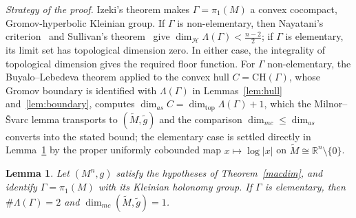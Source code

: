 \documentclass[12pt,oneside,a4paper]{article}
\theoremstyle{mytheorem}
\newtheorem{lemma}[definition]{Lemma}
\theoremstyle{remark}
\theoremstyle{definition}
\begin{document}
\medskip
\noindent\textit{Strategy of the proof.}
Izeki's theorem makes \(\Gamma=\pi_1(M)\) a convex cocompact,
Gromov-hyperbolic Kleinian group.  If \(\Gamma\) is non-elementary, then
Nayatani's criterion~\cite[Corollary~3.4]{zbMATH01028179} and Sullivan's
theorem~\cite{zbMATH03903608} give
\(\dim_{\mathcal H}\Lambda(\Gamma)<\frac{n-2}{2}\); if \(\Gamma\) is
elementary, its limit set has topological dimension zero.  In either case,
the integrality of topological dimension gives the required floor function.
For \(\Gamma\) non-elementary, the Buyalo--Lebedeva theorem \cite{zbMATH05232578} applied to the
convex hull \(C=\mathrm{CH}(\Gamma)\), whose
Gromov boundary is identified with \(\Lambda(\Gamma)\) in
Lemmas~\ref{lem:hull} and~\ref{lem:boundary}, computes
\(\dim_{as}C=\dim_{\mathrm{top}}\Lambda(\Gamma)+1\), which the Milnor--\v{S}varc
lemma transports to \((\widetilde M,\widetilde g)\) and the comparison
\(\dim_{mc}\leq\dim_{as}\) converts into the stated bound; the elementary
case is settled directly in Lemma~\ref{lem:elementary} by the proper
uniformly cobounded map \(x\mapsto\log|x|\) on \(\widetilde M\cong\mathbb R^n\setminus\{0\}\).

\begin{lemma}\label{lem:elementary}
Let $(M^n,g)$ satisfy the hypotheses of Theorem~\ref{macdim}, and identify
$\Gamma=\pi_1(M)$ with its Kleinian holonomy group. If \(\Gamma\) is
elementary, then \(\#\Lambda(\Gamma)=2\) and
$\dim_{mc}(\widetilde M,\widetilde g)=1$.
 \end{lemma}
\end{document}
